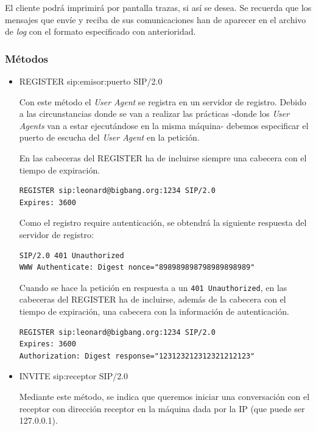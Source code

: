 \documentclass[a4paper,11pt]{article}
\begin{document}
El cliente podrá imprimirá por pantalla trazas, si así se desea. Se recuerda que 
los mensajes que envíe y reciba de sus comunicaciones han de aparecer
en el archivo de \emph{log} con el formato especificado con anterioridad.

\subsubsection{Métodos}

  \begin{itemize}
    \item REGISTER sip:emisor:puerto SIP/2.0

    Con este método el \emph{User Agent} se registra en un servidor de registro. Debido a las circunstancias donde se van a realizar las prácticas -donde los \emph{User Agents} van a estar ejecutándose en la misma máquina- debemos especificar el puerto de escucha del \emph{User Agent} en la petición.

    En las cabeceras del REGISTER ha de incluirse siempre una cabecera con el tiempo de expiración.

\begin{verbatim}
REGISTER sip:leonard@bigbang.org:1234 SIP/2.0
Expires: 3600
\end{verbatim}

    Como el registro require autenticación, se obtendrá la siguiente respuesta del servidor de registro:
    
\begin{verbatim}
SIP/2.0 401 Unauthorized
WWW Authenticate: Digest nonce="898989898798989898989"
\end{verbatim}

    Cuando se hace la petición en respuesta a un \texttt{401 Unauthorized}, en las cabeceras del REGISTER ha de incluirse, además de la cabecera con el tiempo de expiración, una cabecera con la información de autenticación.

\begin{verbatim}
REGISTER sip:leonard@bigbang.org:1234 SIP/2.0
Expires: 3600
Authorization: Digest response="123123212312321212123"
\end{verbatim}


    \item INVITE sip:receptor SIP/2.0

    Mediante este método, se indica que queremos iniciar una conversación con el receptor con dirección receptor en la máquina dada por la IP (que puede ser 127.0.0.1).


\end{itemize}
\end{document}
